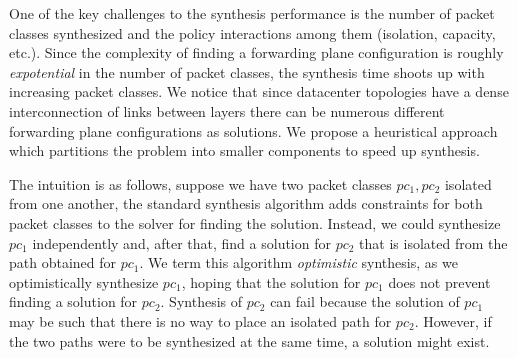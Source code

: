 One of the key challenges to the synthesis performance is the number
of packet classes synthesized and the policy interactions among them
(isolation, capacity, etc.). Since the complexity of finding a
forwarding plane configuration is roughly \emph{expotential} in the
number of packet classes, the synthesis time shoots up with increasing
packet classes. 
We notice that since datacenter topologies have a dense interconnection of
links between layers there can be
numerous different forwarding plane configurations as solutions.
We propose a heuristical approach which partitions the problem 
into smaller components to speed up synthesis.

The intuition is as follows, suppose we have two packet classes $pc_1,
pc_2$ isolated from one another, the standard synthesis algorithm adds 
constraints for both packet classes to the solver for finding the solution.
Instead, we could synthesize $pc_1$
independently and, after that, find a solution for $pc_2$ 
that is isolated from the
path obtained for $pc_1$. We term this
algorithm \emph{optimistic} synthesis, as we optimistically synthesize
$pc_1$, hoping that the solution for $pc_1$ does not prevent finding a
solution for $pc_2$. Synthesis of $pc_2$ can fail because the solution
of $pc_1$ may be such that there is no way to place an isolated path for
$pc_2$. However, if the two paths were to be synthesized at the same time, a
solution might exist.

